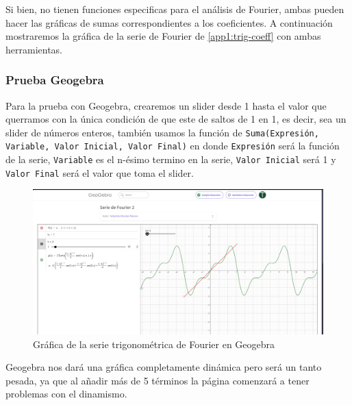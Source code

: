 Si bien, no tienen funciones especificas para el análisis de Fourier, ambas pueden hacer las gráficas de sumas correspondientes a los coeficientes. A continuación mostraremos la gráfica de la serie de Fourier de \ref{app1:trig-coeff} con ambas herramientas.

\subsubsection{Prueba Geogebra}
Para la prueba con Geogebra, crearemos un slider desde 1 hasta el valor que querramos con la única condición de que este de saltos de 1 en 1, es decir, sea un slider de números enteros, también usamos la función de \texttt{Suma(Expresión, Variable, Valor Inicial, Valor Final)} en donde \texttt{Expresión} será la función de la serie, \texttt{Variable} es el n-ésimo termino en la serie, \texttt{Valor Inicial} será 1 y   \texttt{Valor Final} será el valor que toma el slider.
\begin{figure}[H]
	\centering
	\includegraphics[width=1\textwidth]{img/chapter02/geogebra-trig-series.png}
	\caption{Gráfica de la serie trigonométrica de Fourier en Geogebra}
	\label{fig:geogebra-trig-series}  %
\end{figure}
Geogebra nos dará una gráfica completamente dinámica pero será un tanto pesada, ya que al añadir más de 5 términos la página comenzará a tener problemas con el dinamismo.

